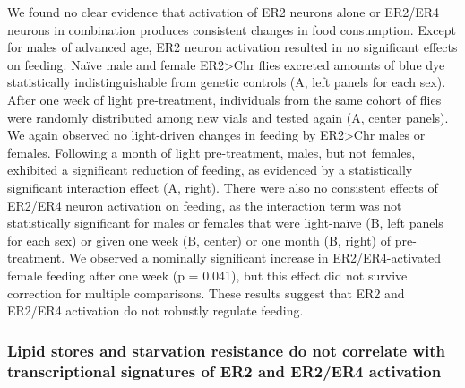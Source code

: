 We found no clear evidence that activation of ER2 neurons alone or ER2/ER4 neurons in combination produces consistent changes in food consumption. 
Except for males of advanced age, ER2 neuron activation resulted in no significant effects on feeding.
Naïve male and female ER2>Chr flies excreted amounts of blue dye statistically indistinguishable from genetic controls (A, left panels for each sex). 
After one week of light pre-treatment, individuals from the same cohort of flies were randomly distributed among new vials and tested again (A, center panels). 
We again observed no light-driven changes in feeding by ER2>Chr males or females. 
Following a month of light pre-treatment, males, but not females, exhibited a significant reduction of feeding, as evidenced by a statistically significant interaction effect (A, right). 
There were also no consistent effects of ER2/ER4 neuron activation on feeding, as the interaction term was not statistically significant for males or females that were light-naïve (B, left panels for each sex) or given one week (B, center) or one month 
(B, right) of pre-treatment.
We observed a nominally significant increase in ER2/ER4-activated female feeding after one week (p = 0.041), but this effect did not survive correction for multiple comparisons.
These results suggest that ER2 and ER2/ER4 activation do not robustly regulate feeding. 

\subsubsection*{Lipid stores and starvation resistance do not correlate with transcriptional signatures of ER2 and ER2/ER4 activation}

